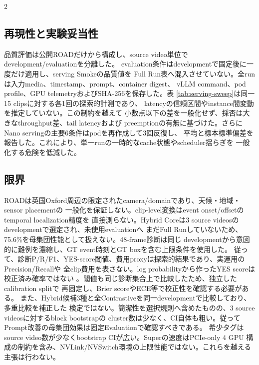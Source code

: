 \documentclass[9pt,a4paper]{extarticle}
\begin{document}
\begin{multicols}{2}
\subsection{再現性と実験妥当性}
品質評価は公開ROADだけから構成し、source video単位でdevelopment/evaluationを分離した。
evaluation条件はdevelopmentで固定後に一度だけ適用し、serving Smokeの品質値を
Full Run表へ混入させていない。全runは入力media、timestamp、prompt、container digest、
vLLM command、pod profile、GPU telemetryおよびSHA-256を保存した。表
\ref{tab:serving-sweep}は同一15 clipsに対する各1回の探索的計測であり、
latencyの信頼区間やinstance間変動を推定していない。この制約を越えて
小数点以下の差を一般化せず、採否は大きなthroughput差、tail latencyおよび
preemptionの有無に基づけた。さらにNano servingの主要6条件はpodを再作成して3回反復し、
平均と標本標準偏差を報告した。これにより、単一runの一時的なcache状態やscheduler揺らぎを
一般化する危険を低減した。

\subsection{限界}
ROADは英国Oxford周辺の限定されたcamera/domainであり、天候・地域・sensor placementの
一般化を保証しない。clip-level変換はevent onset/offsetのtemporal localization精度を
直接測らない。Hybrid Coreは3 source videosのdevelopmentで選定され、未使用evaluationへ
まだFull Runしていないため、75.6\%を母集団性能として扱えない。48-frame診断は同じ
developmentから意図的に難例を濃縮し、GT event時刻とGT boxを含む上限条件を使用した。
従って、診断P/R/F1、YES-score閾値、費用proxyは探索的結果であり、実運用のPrecision/Recallや
全clip費用を表さない。log probabilityから作ったYES scoreは校正済み確率ではない
\cite{guo2017calibration}。閾値も同じ診断集合上で比較したため、独立したcalibration splitで
再固定し、Brier scoreやECE等で校正性を確認する必要がある。
また、Hybrid候補3種と全Contrastiveを同一developmentで比較しており、多重比較を補正した
検定ではない。簡潔性を選択規則へ含めたものの、3 source videosに対するblock bootstrapの
cluster数は少なく、CI自体も粗い。従ってPrompt改善の母集団効果は固定Evaluationで確認すべきである。
希少タグはsource video数が少なくbootstrap CIが広い。Superの速度はPCIe-only 4 GPU
構成の制約を含み、NVLink/NVSwitch環境の上限性能ではない。これらを越える主張は行わない。


\end{multicols}
\end{document}
